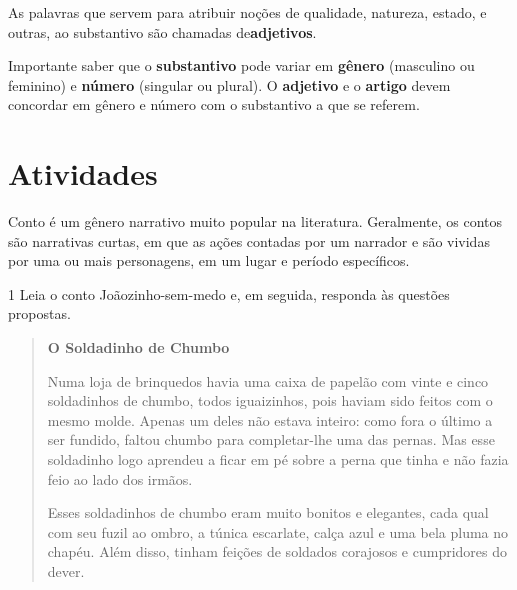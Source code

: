 \begin{conteudo}
\begin{conteudo}
\begin{conteudo}
\begin{conteudo}
{As palavras que servem para atribuir noções de qualidade, 
natureza, estado, e outras, ao substantivo são 
chamadas de\textbf{adjetivos}.

Importante saber que o \textbf{substantivo} pode variar em
\textbf{gênero} (masculino ou feminino) e \textbf{número} (singular ou
plural). O \textbf{adjetivo} e o \textbf{artigo} devem concordar em
gênero e número com o substantivo a que se referem.
}

\section{Atividades}

Conto é um gênero narrativo muito popular na literatura. Geralmente, 
os contos são narrativas curtas, em que as ações contadas por um 
narrador e são vividas por uma ou mais personagens, em um lugar e 
período específicos.  


\num{1} Leia o conto Joãozinho-sem-medo e, em seguida, responda às questões propostas.


\begin{quote}
\textbf{O Soldadinho de Chumbo}




Numa loja de brinquedos havia uma caixa de papelão com vinte e cinco
soldadinhos de chumbo, todos iguaizinhos, pois haviam sido feitos com o
mesmo molde. Apenas um deles não estava inteiro: como fora o último a ser
fundido, faltou chumbo para completar-lhe uma das pernas. Mas esse soldadinho
logo aprendeu a ficar em pé sobre a perna que tinha e não fazia feio
ao lado dos irmãos.

Esses soldadinhos de chumbo eram muito bonitos e elegantes, cada qual
com seu fuzil ao ombro, a túnica escarlate, calça azul e uma bela pluma
no chapéu. Além disso, tinham feições de soldados corajosos e
cumpridores do dever.


\end{quote}
\end{conteudo}
\end{conteudo}
\end{conteudo}
\end{conteudo}
